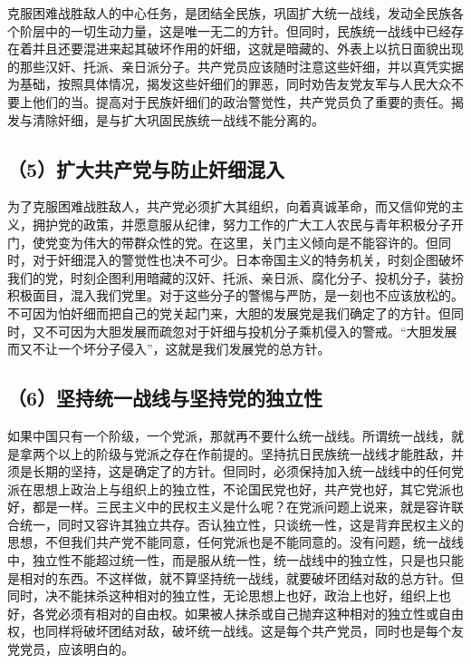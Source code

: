 克服困难战胜敌人的中心任务，是团结全民族，巩固扩大统一战线，发动全民族各个阶层中的一切生动力量，这是唯一无二的方针。但同时，民族统一战线中已经存在着并且还要混进来起其破坏作用的奸细，这就是暗藏的、外表上以抗日面貌出现的那些汉奸、托派、亲日派分子。共产党员应该随时注意这些奸细，并以真凭实据为基础，按照具体情况，揭发这些奸细们的罪恶，同时劝告友党友军与人民大众不要上他们的当。提高对于民族奸细们的政治警觉性，共产党员负了重要的责任。揭发与清除奸细，是与扩大巩固民族统一战线不能分离的。

\subsection{（5）扩大共产党与防止奸细混入}

为了克服困难战胜敌人，共产党必须扩大其组织，向着真诚革命，而又信仰党的主义，拥护党的政策，并愿意服从纪律，努力工作的广大工人农民与青年积极分子开门，使党变为伟大的带群众性的党。在这里，关门主义倾向是不能容许的。但同时，对于奸细混入的警觉性也决不可少。日本帝国主义的特务机关，时刻企图破坏我们的党，时刻企图利用暗藏的汉奸、托派、亲日派、腐化分子、投机分子，装扮积极面目，混入我们党里。对于这些分子的警惕与严防，是一刻也不应该放松的。不可因为怕奸细而把自己的党关起门来，大胆的发展党是我们确定了的方针。但同时，又不可因为大胆发展而疏忽对于奸细与投机分子乘机侵入的警戒。“大胆发展而又不让一个坏分子侵入”，这就是我们发展党的总方针。

\subsection{（6）坚持统一战线与坚持党的独立性}

如果中国只有一个阶级，一个党派，那就再不要什么统一战线。所谓统一战线，就是拿两个以上的阶级与党派之存在作前提的。坚持抗日民族统一战线才能胜敌，并须是长期的坚持，这是确定了的方针。但同时，必须保持加入统一战线中的任何党派在思想上政治上与组织上的独立性，不论国民党也好，共产党也好，其它党派也好，都是一样。三民主义中的民权主义是什么呢？在党派问题上说来，就是容许联合统一，同时又容许其独立共存。否认独立性，只谈统一性，这是背弃民权主义的思想，不但我们共产党不能同意，任何党派也是不能同意的。没有问题，统一战线中，独立性不能超过统一性，而是服从统一性，统一战线中的独立性，只是也只能是相对的东西。不这样做，就不算坚持统一战线，就要破坏团结对敌的总方针。但同时，决不能抹杀这种相对的独立性，无论思想上也好，政治上也好，组织上也好，各党必须有相对的自由权。如果被人抹杀或自己抛弃这种相对的独立性或自由权，也同样将破坏团结对敌，破坏统一战线。这是每个共产党员，同时也是每个友党党员，应该明白的。

